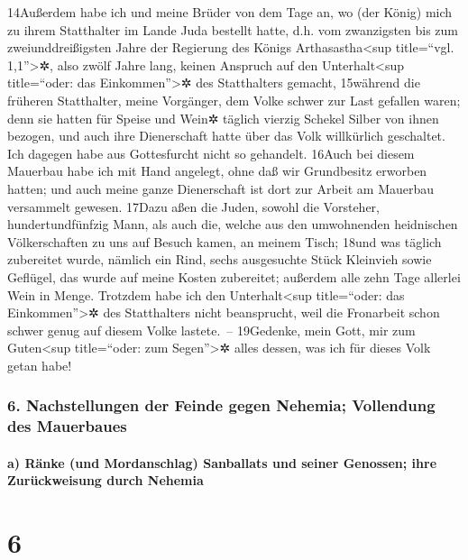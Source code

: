 14Außerdem habe ich und meine Brüder von dem Tage an, wo (der König)
mich zu ihrem Statthalter im Lande Juda bestellt hatte, d.h. vom
zwanzigsten bis zum zweiunddreißigsten Jahre der Regierung des Königs
Arthasastha\textless sup title=``vgl. 1,1''\textgreater✲, also zwölf
Jahre lang, keinen Anspruch auf den Unterhalt\textless sup title=``oder:
das Einkommen''\textgreater✲ des Statthalters gemacht, 15während die
früheren Statthalter, meine Vorgänger, dem Volke schwer zur Last
gefallen waren; denn sie hatten für Speise und Wein✲ täglich vierzig
Schekel Silber von ihnen bezogen, und auch ihre Dienerschaft hatte über
das Volk willkürlich geschaltet. Ich dagegen habe aus Gottesfurcht nicht
so gehandelt. 16Auch bei diesem Mauerbau habe ich mit Hand angelegt,
ohne daß wir Grundbesitz erworben hatten; und auch meine ganze
Dienerschaft ist dort zur Arbeit am Mauerbau versammelt gewesen. 17Dazu
aßen die Juden, sowohl die Vorsteher, hundertundfünfzig Mann, als auch
die, welche aus den umwohnenden heidnischen Völkerschaften zu uns auf
Besuch kamen, an meinem Tisch; 18und was täglich zubereitet wurde,
nämlich ein Rind, sechs ausgesuchte Stück Kleinvieh sowie Geflügel, das
wurde auf meine Kosten zubereitet; außerdem alle zehn Tage allerlei Wein
in Menge. Trotzdem habe ich den Unterhalt\textless sup title=``oder: das
Einkommen''\textgreater✲ des Statthalters nicht beansprucht, weil die
Fronarbeit schon schwer genug auf diesem Volke lastete.~-- 19Gedenke,
mein Gott, mir zum Guten\textless sup title=``oder: zum
Segen''\textgreater✲ alles dessen, was ich für dieses Volk getan habe!

\hypertarget{nachstellungen-der-feinde-gegen-nehemia-vollendung-des-mauerbaues}{%
\subsubsection{6. Nachstellungen der Feinde gegen Nehemia; Vollendung
des
Mauerbaues}\label{nachstellungen-der-feinde-gegen-nehemia-vollendung-des-mauerbaues}}

\hypertarget{a-ruxe4nke-und-mordanschlag-sanballats-und-seiner-genossen-ihre-zuruxfcckweisung-durch-nehemia}{%
\paragraph{a) Ränke (und Mordanschlag) Sanballats und seiner Genossen;
ihre Zurückweisung durch
Nehemia}\label{a-ruxe4nke-und-mordanschlag-sanballats-und-seiner-genossen-ihre-zuruxfcckweisung-durch-nehemia}}

\hypertarget{section-5}{%
\section{6}\label{section-5}}

